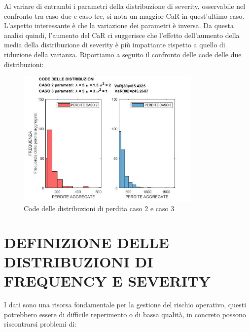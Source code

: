 \documentclass[titlepage]{article}
\begin{document}
\begin{itemize}
{		Al variare di entrambi i parametri della distribuzione di severity, osservabile nel confronto tra caso due e caso tre, si nota un maggior CaR in quest’ultimo caso. L’aspetto interessante è che la variazione dei parametri è inversa. Da questa analisi quindi, l’aumento del CaR ci suggerisce che l’effetto dell’aumento della media della distribuzione di severity è più impattante rispetto a quello di riduzione della varianza. Riportiamo a seguito il confronto delle code delle due distribuzioni:
\begin{figure}[htbp]
	\centering
	\includegraphics[width=0.8\textwidth]{CODE2VS3.jpg}
	\caption{\label{fig:CODE 2VS3.jpg}Code delle distribuzioni di perdita caso 2 e caso 3}
\end{figure}
\newpage
\section{DEFINIZIONE DELLE DISTRIBUZIONI DI FREQUENCY E SEVERITY}
 I dati sono una risorsa fondamentale per la gestione del rischio operativo, questi potrebbero essere di difficile reperimento o di bassa qualità, in concreto possono riscontrarsi problemi di:
 \begin{itemize}
 	


\end{itemize}}
\end{itemize}
\end{document}
